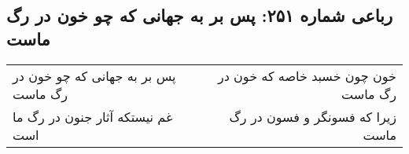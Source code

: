 \begin{center}
\section*{رباعی شماره ۲۵۱: پس بر به جهانی که چو خون در رگ ماست}
\label{sec:0251}
\begin{longtable}{l p{0.5cm} r}
پس بر به جهانی که چو خون در رگ ماست
&&
خون چون خسبد خاصه که خون در رگ ماست
\\
غم نیستکه آثار جنون در رگ ما است
&&
زیرا که فسونگر و فسون در رگ ماست
\\
\end{longtable}
\end{center}
